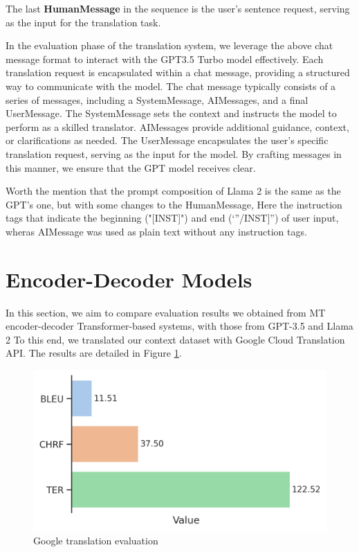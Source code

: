 \documentclass[twocolumn]{article}
\begin{document}
The last \textbf{HumanMessage} in the sequence is the user’s sentence request, serving as the input for the translation task.


In the evaluation phase of the translation system, we leverage the above chat message format to interact with the GPT3.5 Turbo model effectively. Each translation request is encapsulated within a chat message, providing a structured way to communicate with the model. The chat message typically consists of a series of messages, including a SystemMessage, AIMessages, and a final UserMessage. The SystemMessage sets the context and instructs the model to perform as a skilled translator. AIMessages provide additional guidance, context, or clarifications as needed. The UserMessage encapsulates the user’s specific translation request, serving as the input for the model. By crafting messages in this manner, we ensure that the GPT model receives clear.

Worth the mention that the prompt composition of Llama 2 is the same as the GPT's one, but with some changes to the HumanMessage, Here the instruction tags that indicate the beginning ("[INST]") and end (`”/INST]”) of user input, wheras AIMessage was used as plain text without any instruction tags.


\section{Encoder-Decoder Models}
In this section, we aim to compare evaluation
results we obtained from MT encoder-decoder Transformer-based systems\cite{vaswani2017attention}, with those from GPT-3.5 and Llama 2 To this end, we translated our context dataset with Google Cloud Translation API. The results are detailed in Figure \ref{fig:google_transltation_evaluation}.

\begin{figure}
\centering
\includegraphics[width=\linewidth, ]{figs/Google_translate_api} %
\caption{ Google translation evaluation}

\label{fig:google_transltation_evaluation}
\end{figure}
\end{document}
